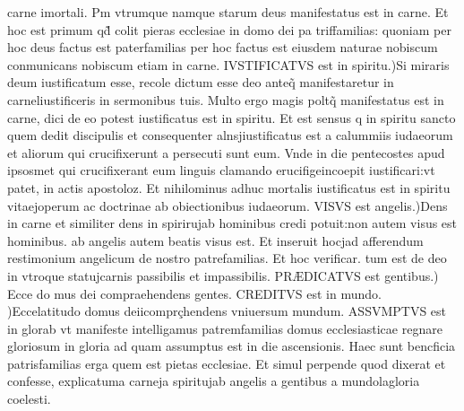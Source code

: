 \documentclass{article}
\begin{document}
\begin{pages}
carne imortali. Pm vtrumque namque starum deus manifestatus est in carne. Et hoc est primum qd̃ colit pieras ecclesiae in domo dei pa triffamilias: quoniam per hoc deus factus est paterfamilias per hoc factus est eiusdem naturae nobiscum conmunicans nobiscum etiam in carne. IVSTIFICATVS est in spiritu.)Si miraris deum iustificatum esse, recole dictum esse deo anteq̃ manifestaretur in carneliustificeris in sermonibus tuis. Multo ergo magis poltq̃ manifestatus est in carne, dici de eo potest iustificatus est in spiritu. Et est sensus q in spiritu sancto quem dedit discipulis et consequenter alnsjiustificatus est a calummiis iudaeorum et aliorum qui crucifixerunt a persecuti sunt eum. Vnde in die pentecostes apud ipsosmet qui crucifixerant eum linguis clamando erucifigeincoepit iustificari:vt patet, in actis apostoloz. Et nihilominus adhuc mortalis iustificatus est in spiritu vitaejoperum ac doctrinae ab obiectionibus iudaeorum. VISVS est angelis.)Dens in carne et similiter dens in spirirujab hominibus credi potuit:non autem visus est hominibus. ab angelis autem beatis visus est. Et inseruit hocjad afferendum restimonium angelicum de nostro patrefamilias. Et hoc verificar. tum est de deo in vtroque statujcarnis passibilis et impassibilis. PRÆDICATVS est gentibus.) Ecce do mus dei compraehendens gentes. CREDITVS est in mundo. )Eccelatitudo domus deiicomprçhendens vniuersum mundum. ASSVMPTVS est in glorab vt manifeste intelligamus patremfamilias domus ecclesiasticae regnare gloriosum in gloria ad quam assumptus est in die ascensionis. Haec sunt bencficia patrisfamilias erga quem est pietas ecclesiae. Et simul perpende quod dixerat et confesse, explicatuma carneja spiritujab angelis a gentibus a mundolagloria coelesti.  \pend

\end{pages}
\end{document}
